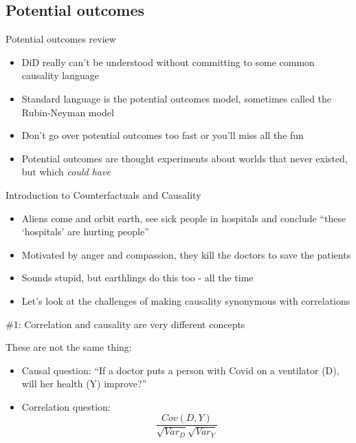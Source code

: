 \documentclass{beamer}
\begin{document}
\subsection{Potential outcomes}

\begin{frame}{Potential outcomes review}

\begin{itemize}
\item DiD really can't be understood without committing to some common causality language
\item Standard language is the potential outcomes model, sometimes called the Rubin-Neyman model
\item Don't go over potential outcomes too fast or you'll miss all the fun
\item Potential outcomes are thought experiments about worlds that never existed, but which \emph{could have}
\end{itemize}

\end{frame}

\begin{frame}{Introduction to Counterfactuals and Causality}
	
	\begin{itemize}
	\item Aliens come and orbit earth, see sick people in hospitals and conclude ``these `hospitals' are hurting people'' 
	\item Motivated by anger and compassion, they kill the doctors to save the patients
	\item Sounds stupid, but earthlings do this too - all the time
	\item Let's look at the challenges of making causality synonymous with correlations
	\end{itemize}		
		
\end{frame}

\begin{frame}{\#1: Correlation and causality are very different concepts}

These are not the same thing:

		\begin{itemize}
	\item Causal question: ``If a doctor puts a person with Covid on a ventilator (D), will her health (Y) improve?''
	\item Correlation question:  $$\frac{Cov(D,Y)}{\sqrt{Var_D}\sqrt{{Var_Y}}}$$
		\end{itemize}

\end{frame}
\end{document}
